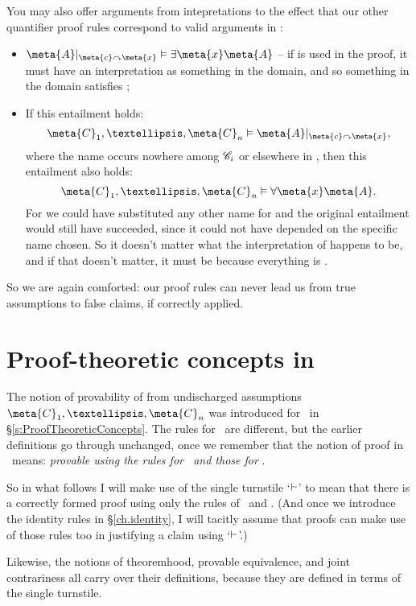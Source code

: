 You may also offer arguments from intepretations to the effect that our other quantifier proof rules correspond to valid arguments in \FOL:\begin{itemize}
	\item $\meta{A}\subs{\meta{c}}{\meta{x}} \entails \exists \meta{x}\meta{A}$ – if  is used in the proof, it must have an interpretation as something in the domain, and so something in the domain satisfies ;
	\item If this entailment holds: $$\meta{C}_{1},…,\meta{C}_{n} \entails \meta{A}\subs{\meta{c}}{\meta{x}},$$ where the name  occurs nowhere among $\mathscr{C}_{i}$ or elsewhere in , then this entailment also holds: $$\meta{C}_{1},…,\meta{C}_{n} \entails \forall\meta{x}\meta{A}.$$ For we could have substituted any other name for  and the original entailment would still have succeeded, since it could not have depended on the specific name chosen. So it doesn't matter what the interpretation of  happens to be, and if that doesn't matter, it must be because everything is .
\end{itemize} 


So we are again comforted: our proof rules can never lead us from true assumptions to false claims, if correctly applied.

\section{Proof-theoretic concepts in \FOL}

The notion of provability of  from undischarged assumptions $\meta{C}_{1},…,\meta{C}_{n}$ was introduced for \TFL\ in §\ref{s:ProofTheoreticConcepts}. The rules for \FOL\ are different, but the earlier definitions go through unchanged, once we remember that the notion of proof in \FOL\ means: \emph{provable using the rules for \TFL\ and those for \FOL}. 

So in what follows I will make use of the single turnstile `$\vdash$' to mean that there is a correctly formed proof using only the rules of \TFL\ and \FOL. (And once we introduce the identity rules in §\ref{ch.identity}, I will tacitly assume that proofs can make use of those rules too in justifying a claim using `$\vdash$'.) 

Likewise, the notions of theoremhood, provable equivalence, and joint contrariness all carry over their definitions, because they are defined in terms of the single turnstile.

